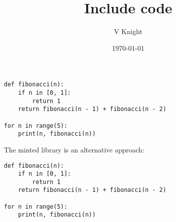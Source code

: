 \documentclass{article}
\title{Include code}
\author{V Knight}
\date{\today}
\begin{document}
\maketitle


\begin{lstlisting}
def fibonacci(n):
    if n in [0, 1]:
        return 1
    return fibonacci(n - 1) + fibonacci(n - 2)

for n in range(5):
    print(n, fibonacci(n))
\end{lstlisting}

The minted library is an alternative approach:

\begin{verbatim}
def fibonacci(n):
    if n in [0, 1]:
        return 1
    return fibonacci(n - 1) + fibonacci(n - 2)

for n in range(5):
    print(n, fibonacci(n))
\end{verbatim}
\end{document}
